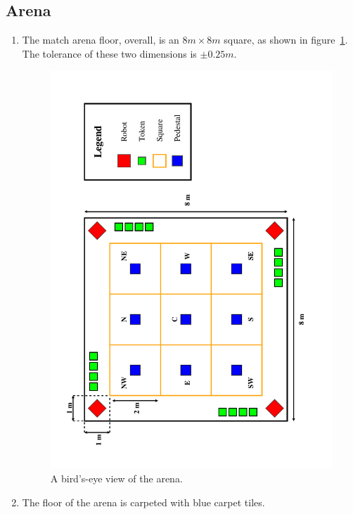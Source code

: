 \subsection{Arena}
\label{sub:arena}
\begin{enumerate}
\item The match arena floor, overall, is an $8m \times 8m$ square, as shown in figure~\ref{fig:arena-dim}.
      The tolerance of these two dimensions is $\pm0.25m$.

\begin{figure}
  \centering
  \includegraphics[width=\textwidth]{./images/arena.pdf}
  \caption{\label{fig:arena-dim}A bird's-eye view of the arena.}
\end{figure}

\item The floor of the arena is carpeted with blue carpet tiles.


\end{enumerate}
